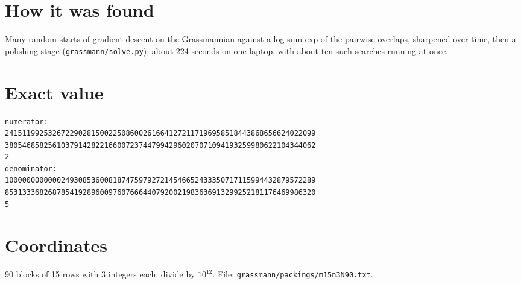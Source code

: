 \documentclass[11pt,a4paper]{article}
\begin{document}
\section{How it was found}
Many random starts of gradient descent on the Grassmannian against a log-sum-exp of the pairwise overlaps, sharpened over time, then a polishing stage (\texttt{grassmann/solve.py}); about 224 seconds on one laptop, with about ten such searches running at once.


\appendix
\section{Exact value}
{\small
\begin{verbatim}
numerator:
241511992532672290281500225086002616641272117196958518443868656624022099
380546858256103791428221660072374479942960207071094193259980622104344062
2
denominator:
100000000000024930853600818747597927214546652433350717115994432879572289
853133368268785419289600976076664407920021983636913299252181176469986320
5
\end{verbatim}}

\section{Coordinates}
90 blocks of 15 rows with 3 integers each; divide by $10^{12}$. File: \texttt{grassmann/packings/m15n3N90.txt}.
{\tiny
\begin{multicols}{3}
\end{multicols}}
\end{document}

